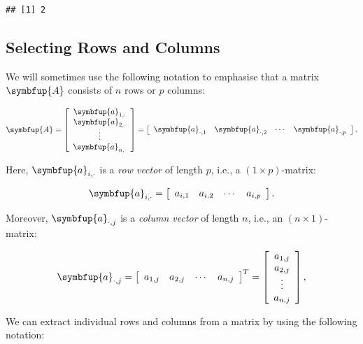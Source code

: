 \documentclass[10pt,b5paper,krantz1]{krantz}
\renewcommand{\mathbf}[1]{\symbfup{#1}}
\begin{document}
\begin{verbatim}
## [1] 2
\end{verbatim}

\hypertarget{selecting-rows-and-columns}{%
\subsection{Selecting Rows and Columns}\label{selecting-rows-and-columns}}

We will sometimes use the following notation to emphasise that
a matrix \(\mathbf{A}\) consists of \(n\) rows
or \(p\) columns:

\[
\mathbf{A}=\left[
\begin{array}{c}
\mathbf{a}_{1,\cdot} \\
\mathbf{a}_{2,\cdot} \\
\vdots\\
\mathbf{a}_{n,\cdot} \\
\end{array}
\right]
=
\left[
\begin{array}{cccc}
\mathbf{a}_{\cdot,1} &
\mathbf{a}_{\cdot,2} &
\cdots &
\mathbf{a}_{\cdot,p} \\
\end{array}
\right].
\]

Here, \(\mathbf{a}_{i,\cdot}\) is a \emph{row vector} of length \(p\),
i.e., a \((1\times p)\)-matrix:

\[
\mathbf{a}_{i,\cdot} = \left[
\begin{array}{cccc}
a_{i,1} &
a_{i,2} &
\cdots &
a_{i,p} \\
\end{array}
\right].
\]

Moreover, \(\mathbf{a}_{\cdot,j}\) is a \emph{column vector} of length \(n\),
i.e., an \((n\times 1)\)-matrix:

\[
\mathbf{a}_{\cdot,j} = \left[
\begin{array}{cccc}
a_{1,j} &
a_{2,j} &
\cdots &
a_{n,j} \\
\end{array}
\right]^T=\left[
\begin{array}{c}
{a}_{1,j} \\
{a}_{2,j} \\
\vdots\\
{a}_{n,j} \\
\end{array}
\right],
\]

We can extract individual rows and columns from a matrix by using
the following notation:
\end{document}
